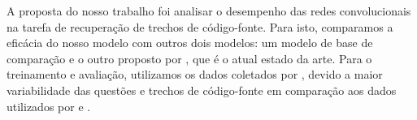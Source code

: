A proposta do nosso trabalho foi analisar o desempenho das redes convolucionais na tarefa de recuperação de trechos de código-fonte. Para isto, comparamos a eficácia do nosso modelo com outros dois modelos: um modelo de base de comparação e o outro proposto por \cite{cambronero-deep-learning-code-search:2019}, que é o atual estado da arte. Para o treinamento e avaliação, utilizamos os dados coletados por \cite{yao-2018}, devido 
a maior variabilidade das questões e trechos de código-fonte em comparação aos dados utilizados por \cite{Allamanis-bimodal-source-code-natural-language:2015} e \cite{iyer-etal-2016-summarizing}. 